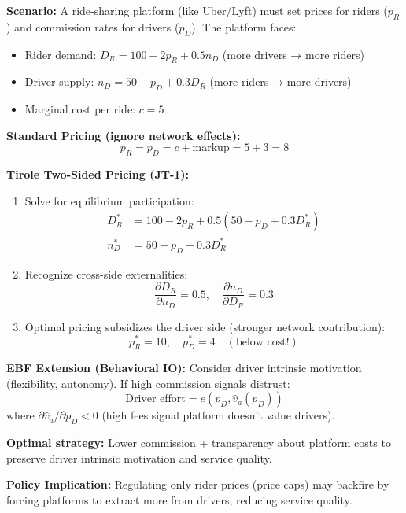 \begin{tcolorbox}[colback=yellow!5!white,colframe=yellow!75!black,title=Worked Example: Ride-Sharing Platform Pricing]
\textbf{Scenario:} A ride-sharing platform (like Uber/Lyft) must set prices for riders ($p_R$) and commission rates for drivers ($p_D$). The platform faces:
\begin{itemize}
    \item Rider demand: $D_R = 100 - 2p_R + 0.5n_D$ (more drivers → more riders)
    \item Driver supply: $n_D = 50 - p_D + 0.3D_R$ (more riders → more drivers)
    \item Marginal cost per ride: $c = 5$
\end{itemize}

\textbf{Standard Pricing (ignore network effects):}
\begin{equation}
p_R = p_D = c + \text{markup} = 5 + 3 = 8
\end{equation}

\textbf{Tirole Two-Sided Pricing (JT-1):}
\begin{enumerate}
    \item Solve for equilibrium participation:
    \begin{align}
    D_R^* &= 100 - 2p_R + 0.5(50 - p_D + 0.3D_R^*) \\
    n_D^* &= 50 - p_D + 0.3D_R^*
    \end{align}

    \item Recognize cross-side externalities:
    \begin{equation}
    \frac{\partial D_R}{\partial n_D} = 0.5, \quad \frac{\partial n_D}{\partial D_R} = 0.3
    \end{equation}

    \item Optimal pricing subsidizes the driver side (stronger network contribution):
    \begin{equation}
    p_R^* = 10, \quad p_D^* = 4 \quad (\text{below cost!})
    \end{equation}
\end{enumerate}

\textbf{EBF Extension (Behavioral IO):}
Consider driver intrinsic motivation (flexibility, autonomy). If high commission signals distrust:
\begin{equation}
\text{Driver effort} = e(p_D, \hat{v}_a(p_D))
\end{equation}
where $\partial \hat{v}_a / \partial p_D < 0$ (high fees signal platform doesn't value drivers).

\textbf{Optimal strategy:} Lower commission + transparency about platform costs to preserve driver intrinsic motivation and service quality.

\textbf{Policy Implication:} Regulating only rider prices (price caps) may backfire by forcing platforms to extract more from drivers, reducing service quality.
\end{tcolorbox}

